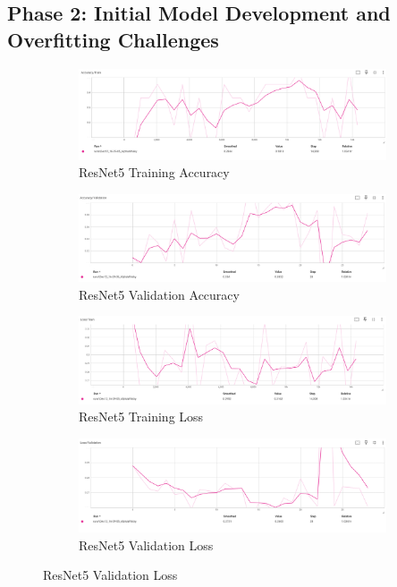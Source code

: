 \documentclass{article}
\begin{document}
\subsection{Phase 2: Initial Model Development and Overfitting Challenges}
\begin{figure}[h]
    \centering

    \begin{subfigure}{0.5\linewidth}
        \includegraphics[width=\linewidth]{images/ResNet5_train_acc.jpg}   
        \caption{ResNet5 Training Accuracy}
        \label{fig:train_acc}
    \end{subfigure}%
    \begin{subfigure}{0.5\linewidth}
        \includegraphics[width=\linewidth]{images/ResNet5_val_acc.jpg}
        \caption{ResNet5 Validation Accuracy}
        \label{fig:val_acc}
    \end{subfigure}

    \begin{subfigure}{0.5\linewidth}
        \includegraphics[width=\linewidth]{images/ResNet5_train_loss.jpg}
        \caption{ResNet5 Training Loss}
        \label{fig:train_loss}
    \end{subfigure}%
    \begin{subfigure}{0.5\linewidth}
        \includegraphics[width=\linewidth]{images/ResNet5_val_loss.jpg}
        \caption{ResNet5 Validation Loss}
        \label{fig:val_loss}
    \end{subfigure}


\end{figure}
\end{document}

